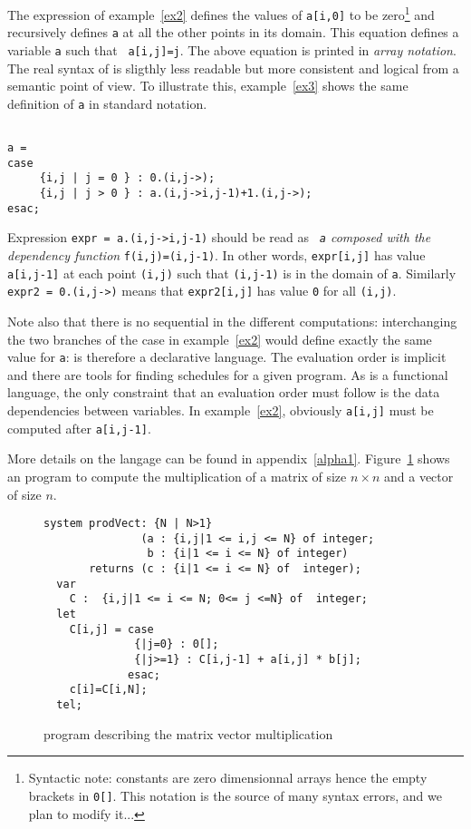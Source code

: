 The {\Alpha} expression of example~\ref{ex2} defines the values of
{\tt a[i,0]} to be zero\footnote{Syntactic note: constants are zero
dimensionnal arrays hence the empty brackets in \texttt{0[]}. This
notation is the source of many syntax errors, and we plan to modify
it...} and recursively defines {\tt a} at all the other points in its
domain. This equation defines a variable {\tt a} such that {\tt
a[i,j]=j}. The above equation is printed in {\em array notation}.  The
real syntax of {\Alpha} is sligthly less readable but more consistent
and logical from a semantic point of view.  To illustrate this,
example~\ref{ex3} shows the same definition of {\tt a} in standard
notation.

\begin{ex}
{\tt 
~\\
a = \\
case\\
\ \ \ \ \       \{i,j | j = 0 \} : 0.(i,j->);\\
\ \ \ \ \      \{i,j | j > 0 \} : a.(i,j->i,j-1)+1.(i,j->);\\
    esac;\\
}
\label{ex3}
\end{ex}

Expression {\tt expr = a.(i,j->i,j-1)} should be read as {\em {\tt
a} composed with the dependency function} \texttt{f(i,j)=(i,j-1)}. In
other words, {\tt expr[i,j]} has value {\tt a[i,j-1]} at each point
\texttt{(i,j)} such that \texttt{(i,j-1)} is in the domain of {\tt a}. 
Similarly {\tt expr2 = 0.(i,j->)} means that {\tt expr2[i,j]} has
value \texttt{0} for all \texttt{(i,j)}.

Note also that there is no sequential in the different
computations: interchanging the two branches of the case in
example~\ref{ex2} would define exactly the same value for {\tt a}:
\alfa{} is therefore a declarative language.
The
evaluation order is implicit and there are tools for finding schedules
for a given program. As {\Alpha} is a functional language, the only
constraint that an evaluation order must follow is the data
dependencies between variables. In example~\ref{ex2},
obviously {\tt a[i,j]} must be computed after {\tt a[i,j-1]}.

More details on the langage can be found in
appendix~\ref{alpha1}. Figure~\ref{fig1} shows an \alfa{} program to
compute the multiplication of a matrix of size $n\times n$ and a vector
of size $n$.
\begin{figure}[htbp]
\begin{verbatim}
system prodVect: {N | N>1}
               (a : {i,j|1 <= i,j <= N} of integer; 
                b : {i|1 <= i <= N} of integer)
       returns (c : {i|1 <= i <= N} of  integer);
  var 
	C :  {i,j|1 <= i <= N; 0<= j <=N} of  integer;
  let
    C[i,j] = case
              {|j=0} : 0[];
              {|j>=1} : C[i,j-1] + a[i,j] * b[j];
             esac;
    c[i]=C[i,N];
  tel;   
\end{verbatim}
\caption{{\Alpha} program describing the matrix vector multiplication}
\label{fig1}
\end{figure}

